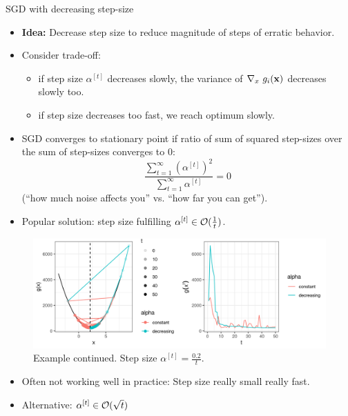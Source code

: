 \documentclass[11pt,compress,t,notes=noshow, xcolor=table]{beamer}
\begin{document}
\begin{vbframe}{SGD with decreasing step-size}

\begin{itemize}
	\item \textbf{Idea: } Decrease step size to reduce magnitude of steps of erratic behavior. 
	\item Consider trade-off: 
	\begin{itemize}
		\item if  step size $\alpha^{[t]}$ decreases slowly, the variance of $\nabla_x ~ g_i(\mathbf{x})$ decreases slowly too.
		\item if step size decreases too fast, we reach optimum slowly.
	\end{itemize}
	\item SGD converges to stationary point if ratio of sum of squared step-sizes over the sum of step-sizes converges to $0$: 
	$$
		\frac{\sum_{t = 1}^\infty \left(\alpha^{[t]}\right)^2}{\sum_{t = 1}^\infty \alpha^{[t]}} = 0
	$$
	(``how much noise affects you'' vs. ``how far you can get''). 
\end{itemize}	

\framebreak 

\begin{itemize}
	\item Popular solution: step size fulfilling $\alpha^{[t]} \in \mathcal{O}(\frac{1}{t})$. 
\end{itemize}

 	\begin{figure}
 		\vspace{-0.3cm}
 		\centering
 		\includegraphics[width = 1\textwidth]{figure_man/sgd_example_decreasing_step_size.png} \newline
		Example continued. Step size $\alpha^{[t]} = \frac{0.2}{t}$. 
 	\end{figure}

\begin{itemize}
 	\item Often not working well in practice: Step size really small really fast. 
 	\item Alternative: $\alpha^{[t]} \in \mathcal{O}(\sqrt{t})$
\end{itemize}

\end{vbframe}
\end{document}
